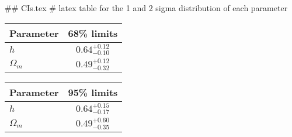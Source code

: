## CIs.tex
# latex table for the 1 and 2 sigma distribution of each parameter

\begin{tabular} { l  c}
 Parameter &  68\% limits\\
\hline
{\boldmath$h              $} & $0.64^{+0.12}_{-0.10}      $\\
{\boldmath$\Omega_m       $} & $0.49^{+0.12}_{-0.32}      $\\
\hline
\end{tabular}

\begin{tabular} { l  c}
 Parameter &  95\% limits\\
\hline
{\boldmath$h              $} & $0.64^{+0.15}_{-0.17}      $\\
{\boldmath$\Omega_m       $} & $0.49^{+0.60}_{-0.35}      $\\
\hline
\end{tabular}
